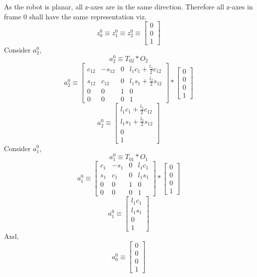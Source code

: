 \documentclass[12pt]{article}
\begin{document}
As the robot is planar, all z-axes are in the same direction.
Therefore all z-axes in frame 0 shall have the same representation viz.
\[
  z_0^{0} \equiv z_1^{0} \equiv z_2^{0} \equiv \begin{bmatrix} 0 \\ 0 \\ 1 \end{bmatrix}
\]
Consider $a_{2}^{0}$,
\[
  a_2^0 \equiv T_{02} * O_2
\]
\[
  a_2^0 \equiv
  \begin{bmatrix}
    c_{12} & -s_{12} & 0 & l_1c_1 + \frac{l_2}{2}c_{12}\\
    s_{12} & c_{12} & 0 & l_1s_1 + \frac{l_2}{2}s_{12} \\
    0 & 0 & 1 & 0 \\
    0 & 0 & 0 & 1
  \end{bmatrix}
  *
  \begin{bmatrix} 0 \\ 0 \\ 0 \\ 1 \end{bmatrix}
\]
\[
  a_2^0 \equiv
  \begin{bmatrix}
    l_1c_1 + \frac{l_2}{2}c_{12}\\
    l_1s_1 + \frac{l_2}{2}s_{12} \\
    0 \\
    1
  \end{bmatrix}
\]
Consider $a_{1}^{0}$,
\[
  a_1^0 \equiv T_{01} * O_1
\]
\[
  a_1^0 \equiv
  \begin{bmatrix} c_1 & -s_1 & 0 & l_1c_1 \\ s_1 & c_1 & 0 & l_1s_1 \\ 0 & 0 & 1 & 0 \\ 0 & 0 & 0 & 1 \end{bmatrix}
  *
  \begin{bmatrix} 0 \\ 0 \\ 0 \\ 1 \end{bmatrix}
\]
\[
  a_1^0 \equiv
  \begin{bmatrix}
    l_1c_1\\
    l_1s_1\\
    0 \\
    1
  \end{bmatrix}
\]
And,
\[
  a_0^0 \equiv \begin{bmatrix} 0 \\ 0 \\ 0 \\ 1 \end{bmatrix}
\]
\end{document}
